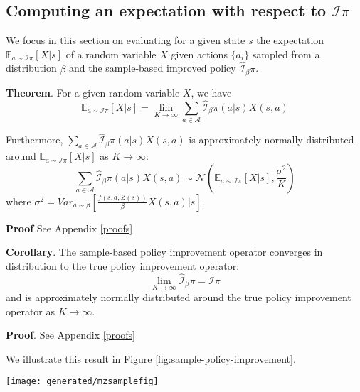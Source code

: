 \documentclass{article}
\newcommand{\ipi}{\mathcal{I}\pi}
\newcommand{\sample}{\beta}
\newcommand{\ibpi}{\hat{\mathcal{I}}_{\sample}\pi}
\begin{document}
\subsection{Computing an expectation with respect to $\ipi$}
\label{expectation-ipi}
We focus in this section on evaluating for a given state $s$ the expectation $\mathbb{E}_{a\sim\ipi}[X|s]$ of a random variable $X$ given actions $\{a_i\}$ sampled from a distribution $\sample$ and the sample-based improved policy $\ibpi$.

\textbf{Theorem}. For a given random variable $X$, we have
$$\mathbb{E}_{a\sim\ipi}[X|s] = \lim_{K\to\infty} \sum_{a\in\mathcal{A}} \ibpi(a|s) X(s, a)$$

Furthermore, $\sum_{a\in\mathcal{A}} \ibpi(a|s) X(s, a)$ is approximately normally distributed around $\mathbb{E}_{a\sim\ipi}[X|s]$ as $K\to\infty$:
$$\sum_{a\in\mathcal{A}} \ibpi(a|s) X(s, a) \sim \mathcal{N}(\mathbb{E}_{a\sim\ipi}[X|s], \frac{\sigma^2}{K})$$
where $\sigma^2 = Var_{a\sim\beta}[\frac{f(s, a, Z(s))}{\sample} X(s, a)|s]$.

\textbf{Proof} See Appendix \ref{proofs}

\textbf{Corollary}.
The sample-based policy improvement operator converges in distribution to the true policy improvement operator:
$$\lim_{K\to\infty} \ibpi = \ipi$$ and is approximately normally distributed around the true policy improvement operator as $K\to\infty$.

\textbf{Proof}. See Appendix \ref{proofs}

We illustrate this result in Figure \ref{fig:sample-policy-improvement}.

\begin{figure*}
\texttt{[image: generated/mzsamplefig]}
\vspace*{-7mm}
\caption[]{
\label{fig:sample-policy-improvement}
\textbf{Sample-based Policy Improvement.} On the left, the current policy $\pi(a|s)$. Next, $K$ actions $\{a_i\}$ are sampled from a proposal distribution $\sample$ and $\hat{\sample}(a|s)$ is the corresponding empirical distribution. A sample-based improved policy $\ibpi(a|s)= (\hat{\sample}/\sample)(a|s) f(s, a, \hat{Z}_\sample(s))$ is then built. As the number of samples $K$ increases  $\ibpi(a|s)$ converges to the improved policy $\ipi(a|s)=f(s, a, Z(s))$.
}
\end{figure*}
\end{document}
